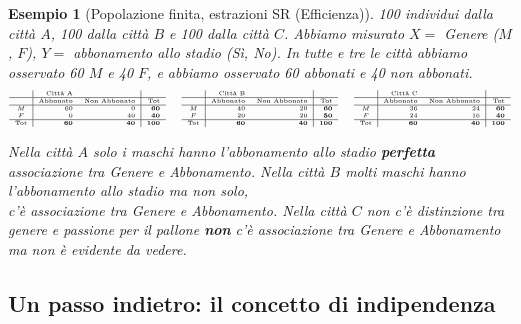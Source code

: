\documentclass[
  11pt,
]{book}
\theoremstyle{mytheoremstyle}
\theoremstyle{mydefstyle}
\newtheorem{example}{{Esempio}}[section]
\begin{document}
\begin{example}[Popolazione finita, estrazioni SR (Efficienza)]
100 individui dalla città \(A\), 100 dalla città \(B\) e 100 dalla città \(C\).
Abbiamo misurato \(X=\) Genere (\(M\), \(F\)), \(Y=\) abbonamento allo stadio (Sì, No).
In tutte e tre le città abbiamo osservato 60 \(M\) e 40 \(F\), e abbiamo osservato 60 abbonati
e 40 non abbonati.
\[\tiny
\begin{array}{c|rr|r}
 & \text{Città A} & &\\ \hline
 &\text{Abbonato} &\text{Non Abbonato} &\bf\text{Tot}\\
  \hline
   M & 60 & 0 & \bf 60\\ 
   F & 0 & 40  &\bf 40\\ \hline
  \bf\text{Tot} &\bf 60 &\bf 40 &\bf 100\\ 
\end{array}
\qquad
\begin{array}{c|rr|r}
 & \text{Città B} & &\\ \hline
 &\text{Abbonato} &\text{Non Abbonato} &\bf\text{Tot}\\
  \hline
  M & 40 & 20 & \bf60\\ 
  F & 20 & 20  &\bf50\\ \hline
  \bf\text{Tot} &\bf 60 &\bf 40 &\bf 100\\ 
\end{array}
\qquad
\begin{array}{c|rr|r}
 & \text{Città C} & &\\ \hline
 &\text{Abbonato} &\text{Non Abbonato} &\bf\text{Tot}\\
  \hline
  M & 36 & 24 & \bf60\\ 
  F & 24 & 16  &\bf40\\ \hline
  \bf\text{Tot} &\bf 60 &\bf 40 &\bf 100\\ 
\end{array}
\]

Nella città \(A\) solo i maschi hanno l'abbonamento allo stadio \textbf{perfetta} associazione tra Genere e Abbonamento. Nella città \(B\) molti maschi hanno l'abbonamento allo stadio ma non solo,\\
c'è associazione tra Genere e Abbonamento.
Nella città \(C\) non c'è distinzione tra genere e passione per il pallone
\textbf{non} c'è associazione tra Genere e Abbonamento ma non è evidente da vedere.
\end{example}

\subsection{Un passo indietro: il concetto di indipendenza}\label{un-passo-indietro-il-concetto-di-indipendenza}
\end{document}

